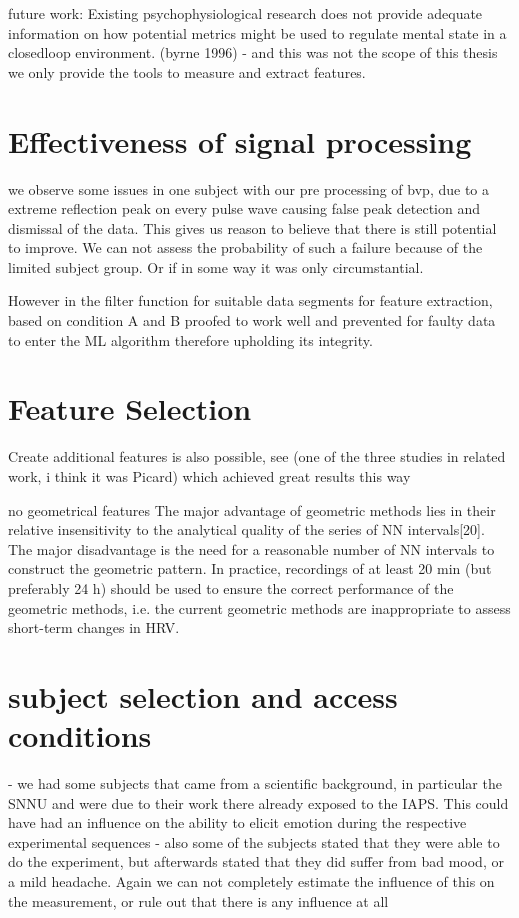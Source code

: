 

future work: Existing psychophysiological research does not provide adequate information
on how potential metrics might be used to regulate mental state in a closedloop
environment. (byrne 1996)
- and this was not the scope of this thesis we only provide the tools to measure and extract features.

\section{Effectiveness of signal processing}
we observe some issues in one subject with our pre processing of bvp, due to a extreme reflection peak on every pulse wave causing false peak detection and dismissal of the data. This gives us reason to believe that there is still potential to improve. We can not assess the probability of such a failure because of the limited subject group. Or if in some way it was only circumstantial.

However in the filter function for suitable data segments for feature extraction, based on condition A and B proofed to work well and prevented for faulty data to enter the ML algorithm therefore upholding its integrity.
\section{Feature Selection}
Create additional features is also possible, see (one of the three studies in related work, i think it was Picard) which achieved great results this way

no geometrical features 
The major advantage of geometric methods lies
in their relative insensitivity to the analytical quality of
the series of NN intervals[20]. The major disadvantage is
the need for a reasonable number of NN intervals to
construct the geometric pattern. In practice, recordings
of at least 20 min (but preferably 24 h) should be used
to ensure the correct performance of the geometric
methods, i.e. the current geometric methods are inappropriate
to assess short-term changes in HRV.
\section{subject selection and access conditions}
- we had some subjects that came from a scientific background, in particular the SNNU and were due to their work there already exposed to the IAPS. This could have had an influence on the ability to elicit emotion during the respective experimental sequences 
- also some of the subjects stated that they were able to do the experiment, but afterwards stated that they did suffer from bad mood, or a mild headache. Again we can not completely estimate the influence of this on the measurement, or rule out that there is any influence at all

